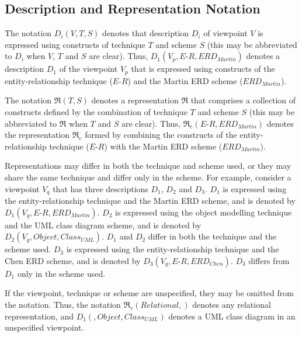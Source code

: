 \documentclass[10pt]{llncs}
\newcommand{\ER}{\mathit{E\textrm{-}R}}
\newcommand{\Martin}{\mathit{ERD_{Martin}}}
\newcommand{\Chen}{\mathit{ERD_{Chen}}}
\newcommand{\RM}{\mathit{Relational}}
\newcommand{\Representation}[3]{\ensuremath{\mathfrak{#1}(#2,#3)}}
\newcommand{\RepresentationS}[4]{\ensuremath{\mathfrak{#1}_{#2}(#3,#4)}}
\newcommand{\Rep}[1]{\ensuremath{\mathfrak{#1}}}
\newcommand{\RepS}[2]{\ensuremath{\mathfrak{#1}_{#2}}}
\newcommand{\Description}[4]{\ensuremath{#1(#2,#3,#4)}}
\begin{document}


\subsection{Description and Representation Notation}

The notation \Description{D_{i}}{V}{T}{S} denotes that description $D_{i}$ of viewpoint $V$ is expressed using constructs of technique $T$ and scheme $S$ (this may be abbreviated to $D_{i}$ when $V$, $T$ and $S$ are clear). Thus, \Description{D_{1}}{V_{p}}{\ER}{\Martin} denotes a description $D_{1}$ of the viewpoint $V_{p}$ that is expressed using constructs of the entity-relationship technique ($\ER$) and the Martin ERD scheme ($\Martin$).

The notation \Representation{R}{T}{S} denotes a representation \Rep{R} that comprises a collection of constructs defined by the combination of technique $T$ and scheme $S$ (this may be abbreviated to \Rep{R} when $T$ and $S$ are clear). Thus, \RepresentationS{R}{e}{\ER}{\Martin} denotes the representation \RepS{R}{e} formed by combining the constructs of the entity-relationship technique ($\ER$) with the Martin ERD scheme ($\Martin$).

Representations may differ in both the technique and scheme used, or they may share the same technique and differ only in the scheme. For example, consider a viewpoint $V_{q}$ that has three descriptions $D_{1}$, $D_{2}$ and $D_{3}$. $D_{1}$ is expressed using the entity-relationship technique and the Martin ERD scheme, and is denoted by \Description{D_{1}}{V_{q}}{\ER}{\Martin}. $D_{2}$ is expressed using the object modelling technique and the UML class diagram scheme, and is denoted by \Description{D_{2}}{V_{q}}{\mathit{Object}}{\mathit{Class_{UML}}}. $D_{1}$ and $D_{2}$ differ in both the technique and the scheme used. $D_{3}$ is expressed using the entity-relationship technique and the Chen ERD scheme, and is denoted by \Description{D_{3}}{V_{q}}{\ER}{\Chen}. $D_{3}$ differs from $D_{1}$ only in the scheme used.

If the viewpoint, technique or scheme are unspecified, they may be omitted from the notation. Thus, the notation \RepresentationS{R}{r}{\RM}{} denotes any relational representation, and \Description{D_{1}}{}{Object}{Class_{UML}} denotes a UML class diagram in an unspecified viewpoint.
\end{document}
